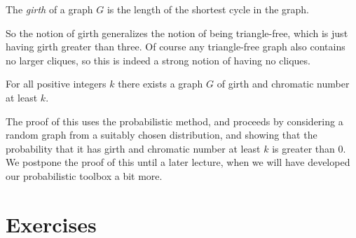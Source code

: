 \documentclass[nobib]{tufte-handout}
\begin{document}
\begin{definition}
  The \emph{girth} of a graph $G$ is the length of the shortest cycle in the graph.
\end{definition}

So the notion of girth generalizes the notion of being triangle-free, which is just having girth greater than three. Of course any triangle-free graph also contains no larger cliques, so this is indeed a strong notion of having no cliques.

\begin{theorem}[Erd\H{o}s, 1959]
  For all positive integers $k$ there exists a graph $G$ of girth and chromatic number at least $k$.
\end{theorem}

The proof of this uses the probabilistic method, and proceeds by considering a random graph from a suitably chosen distribution, and showing that the probability that it has girth and chromatic number at least $k$ is greater than $0$. We postpone the proof of this until a later lecture, when we will have developed our probabilistic toolbox a bit more.


\section{Exercises}


%
%
\end{document}
